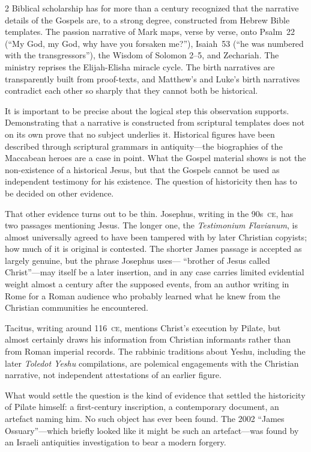 \documentclass[11pt,oneside]{article}
\begin{document}
\begin{multicols}{2}
Biblical scholarship has for more than a century recognized that the
narrative details of the Gospels are, to a strong degree, constructed
from Hebrew Bible templates.  The passion narrative of Mark maps,
verse by verse, onto Psalm~22 (\enquote{My God, my God, why have
you forsaken me?}), Isaiah~53 (\enquote{he was numbered with the
transgressors}), the Wisdom of Solomon 2--5, and Zechariah.  The
ministry reprises the Elijah-Elisha miracle cycle.  The birth
narratives are transparently built from proof-texts, and Matthew's
and Luke's birth narratives contradict each other so sharply that
they cannot both be historical.

It is important to be precise about the logical step this
observation supports.  Demonstrating that a narrative is constructed
from scriptural templates does not on its own prove that no subject
underlies it.  Historical figures have been described through
scriptural grammars in antiquity---the biographies of the Maccabean
heroes are a case in point.  What the Gospel material shows is not
the non-existence of a historical Jesus, but that the Gospels
cannot be used as independent testimony for his existence.  The
question of historicity then has to be decided on other evidence.

That other evidence turns out to be thin.  Josephus, writing in the
90s~\textsc{ce}, has two passages mentioning Jesus.  The longer
one, the \textit{Testimonium Flavianum}, is almost universally
agreed to have been tampered with by later Christian copyists; how
much of it is original is contested.  The shorter James passage is
accepted as largely genuine, but the phrase Josephus uses---
\enquote{brother of Jesus called Christ}---may itself be a later
insertion, and in any case carries limited evidential weight almost
a century after the supposed events, from an author writing in
Rome for a Roman audience who probably learned what he knew from
the Christian communities he encountered.

Tacitus, writing around 116~\textsc{ce}, mentions Christ's
execution by Pilate, but almost certainly draws his information
from Christian informants rather than from Roman imperial records.
The rabbinic traditions about Yeshu, including the later
\textit{Toledot Yeshu} compilations, are polemical engagements with
the Christian narrative, not independent attestations of an
earlier figure.

What would settle the question is the kind of evidence that settled
the historicity of Pilate himself: a first-century inscription, a
contemporary document, an artefact naming him.  No such object has
ever been found.  The 2002 \enquote{James Ossuary}---which briefly
looked like it might be such an artefact---was found by an Israeli
antiquities investigation to bear a modern forgery.


\end{multicols}
\end{document}
